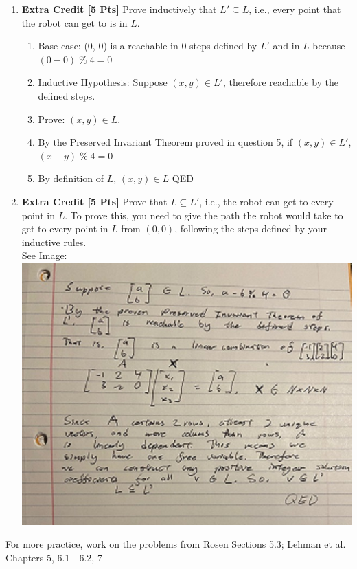 \documentclass[11pt]{article}
\begin{document}
\begin{enumerate}
\begin{enumerate}
            \item {\bf Extra Credit [5 Pts]}    Prove inductively that $L' \subseteq L$, i.e., every point that the robot can get to is in $L$. \\
            \begin{enumerate}
                \item Base case: (0, 0) is a reachable in 0 steps defined by $L'$ and in $L$ because $(0 - 0)\;\%\; 4 = 0$
                \item Inductive Hypothesis: Suppose $(x, y) \in L'$, therefore reachable by the defined steps.
                \item Prove: $(x, y) \in L$.
                \item By the Preserved Invariant Theorem proved in question 5, if $(x, y) \in L'$, $(x - y)\;\%\; 4 = 0$
                \item By definition of $L$, $(x, y) \in L$ \null\hfill QED
            \end{enumerate}
            \item {\bf Extra Credit [5 Pts]}    Prove that $L \subseteq L'$, i.e., the robot can get to every point in $L$. To prove this, you need to give the path the robot would take to get to every point in $L$ from $(0,0)$, following the steps defined by your inductive rules. \\
                See Image: \\
                \includegraphics{6c.jpg}
        \end{enumerate}
    \end{enumerate}


    \noindent
    For more practice, work on the problems from Rosen Sections 5.3; Lehman et al. Chapters 5, 6.1 - 6.2, 7
\end{document}
